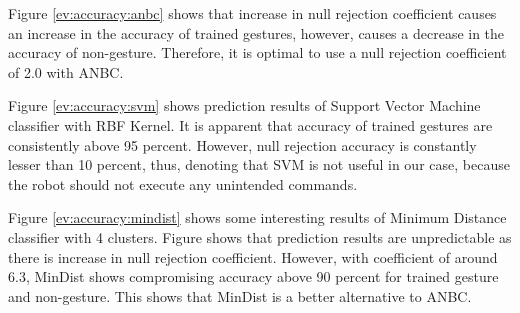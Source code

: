 Figure \ref{ev:accuracy:anbc} shows that increase in null rejection coefficient causes an increase in the accuracy of trained gestures, however, causes a decrease in the accuracy of non-gesture. Therefore, it is optimal to use a null rejection coefficient of 2.0 with ANBC.

Figure \ref{ev:accuracy:svm} shows prediction results of Support Vector Machine classifier with RBF Kernel. It is apparent that accuracy of trained gestures are consistently above 95 percent. However, null rejection accuracy is constantly lesser than 10 percent, thus, denoting that SVM is not useful in our case, because the robot should not execute any unintended commands.

Figure \ref{ev:accuracy:mindist} shows some interesting results of Minimum Distance classifier with 4 clusters. Figure shows that prediction results are unpredictable as there is increase in null rejection coefficient. However, with coefficient of around 6.3, MinDist shows compromising accuracy above 90 percent for trained gesture and non-gesture. This shows that MinDist is a better alternative to ANBC. 



\clearpage 
 
 


